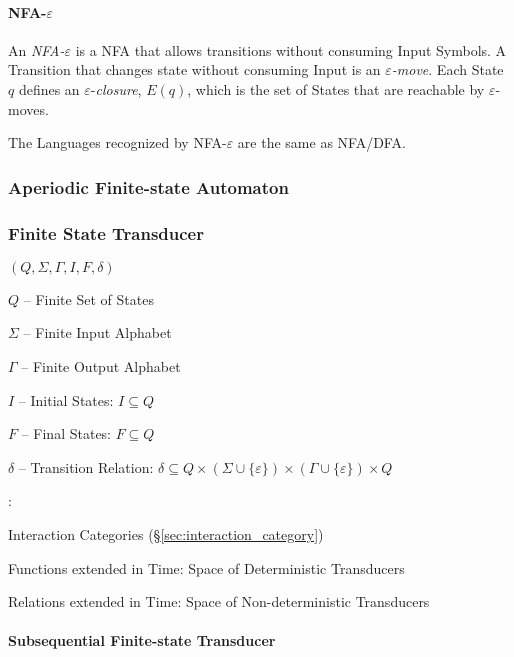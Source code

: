 \paragraph{NFA-$\varepsilon$}\label{sec:nfa_e}\hfill

An \emph{NFA-$\varepsilon$} is a NFA that allows transitions without
consuming Input Symbols. A Transition that changes state without
consuming Input is an \emph{$\varepsilon$-move}. Each State $q$
defines an $\varepsilon$-\emph{closure}, $E(q)$, which is the set of
States that are reachable by $\varepsilon$-moves.

The Languages recognized by NFA-$\varepsilon$ are the same as NFA/DFA.



\subsubsection{Aperiodic Finite-state Automaton}
\label{sec:aperiodic_automaton}

\subsubsection{Finite State Transducer}\label{sec:fst}

$(Q,\Sigma,\Gamma,I,F,\delta)$

$Q$ -- Finite Set of States

$\Sigma$ -- Finite Input Alphabet

$\Gamma$ -- Finite Output Alphabet

$I$ -- Initial States: $I \subseteq Q$

$F$ -- Final States: $F \subseteq Q$

$\delta$ -- Transition Relation: $\delta \subseteq Q \times (\Sigma
\cup \{\varepsilon\}) \times (\Gamma \cup \{\varepsilon\}) \times Q$


\asterism


\cite{abramsky-gay-nagarajan96}:

Interaction Categories (\S\ref{sec:interaction_category})

Functions extended in Time: Space of Deterministic Transducers

Relations extended in Time: Space of Non-deterministic Transducers



\paragraph{Subsequential Finite-state Transducer}\label{sec:sft}\hfill

